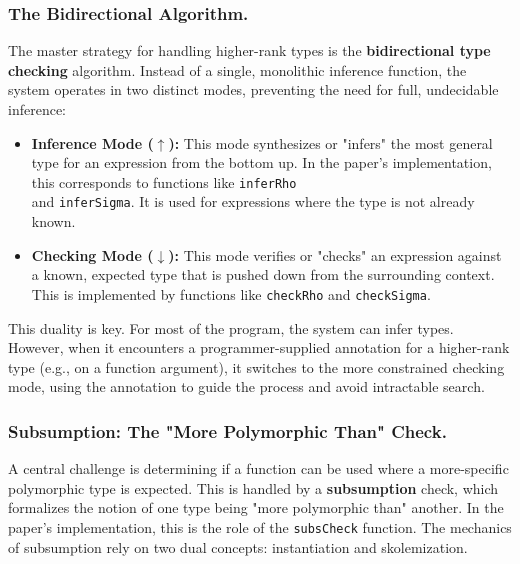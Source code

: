 \subsubsection{The Bidirectional Algorithm.}
The master strategy for handling higher-rank types is the \textbf{bidirectional type checking} algorithm. Instead of a single, monolithic inference function, the system operates in two distinct modes, preventing the need for full, undecidable inference:
\begin{itemize}
    \item \textbf{Inference Mode ($\uparrow$):} This mode synthesizes or "infers" the most general type for an expression from the bottom up. In the paper's implementation, this corresponds to functions like \texttt{inferRho} \\ and \texttt{inferSigma}. It is used for expressions where the type is not already known.
    \item \textbf{Checking Mode ($\downarrow$):} This mode verifies or "checks" an expression against a known, expected type that is pushed down from the surrounding context. This is implemented by functions like \texttt{checkRho} and \texttt{checkSigma}.
\end{itemize}
This duality is key. For most of the program, the system can infer types. However, when it encounters a programmer-supplied annotation for a higher-rank type (e.g., on a function argument), it switches to the more constrained checking mode, using the annotation to guide the process and avoid intractable search.

\subsubsection{Subsumption: The "More Polymorphic Than" Check.}
A central challenge is determining if a function can be used where a more-specific polymorphic type is expected. This is handled by a \textbf{subsumption} check, which formalizes the notion of one type being "more polymorphic than" another. In the paper's implementation, this is the role of the \texttt{subsCheck} function. The mechanics of subsumption rely on two dual concepts: instantiation and skolemization.

